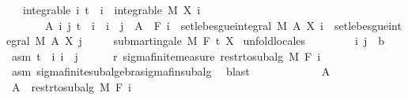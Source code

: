 \begin{isabellebody}
\ \ \ integrable{\isacharcolon}{\kern0pt}\ {\isachardoublequoteopen}{\isasymAnd}i{\isachardot}{\kern0pt}\ t\ {\isasymle}\ i\ {\isasymLongrightarrow}\ integrable\ M\ {\isacharparenleft}{\kern0pt}X\ i{\isacharparenright}{\kern0pt}{\isachardoublequoteclose}\isanewline
\ \ \ \ \ \ \ {\isachardoublequoteopen}{\isasymAnd}A\ i\ j{\isachardot}{\kern0pt}\ t\ {\isasymle}\ i\ {\isasymLongrightarrow}\ i\ {\isasymle}\ j\ {\isasymLongrightarrow}\ A\ {\isasymin}\ F\ i\ {\isasymLongrightarrow}\ set{\isacharunderscore}{\kern0pt}lebesgue{\isacharunderscore}{\kern0pt}integral\ M\ A\ {\isacharparenleft}{\kern0pt}X\ i{\isacharparenright}{\kern0pt}\ {\isasymle}\ set{\isacharunderscore}{\kern0pt}lebesgue{\isacharunderscore}{\kern0pt}integral\ M\ A\ {\isacharparenleft}{\kern0pt}X\ j{\isacharparenright}{\kern0pt}{\isachardoublequoteclose}\isanewline
\ \ \ \ \ {\isachardoublequoteopen}submartingale\ M\ F\ t\ X{\isachardoublequoteclose}\isanewline
%
\isadelimproof
%
\endisadelimproof
%
\isatagproof
{}\isamarkupfalse%
\ {\isacharparenleft}{\kern0pt}unfold{\isacharunderscore}{\kern0pt}locales{\isacharparenright}{\kern0pt}\isanewline
\ \ \isacommand{{\isacharbraceleft}{\kern0pt}}\isamarkupfalse%
\isanewline
\ \ \ \ \isamarkupfalse%
\ i\ j\ {\isacharcolon}{\kern0pt}{\isacharcolon}{\kern0pt}\ {\isacharprime}{\kern0pt}b\ \isamarkupfalse%
\ asm{\isacharcolon}{\kern0pt}\ {\isachardoublequoteopen}t\ {\isasymle}\ i{\isachardoublequoteclose}\ {\isachardoublequoteopen}i\ {\isasymle}\ j{\isachardoublequoteclose}\isanewline
\ \ \ \ \isamarkupfalse%
\ r{\isacharcolon}{\kern0pt}\ sigma{\isacharunderscore}{\kern0pt}finite{\isacharunderscore}{\kern0pt}measure\ {\isachardoublequoteopen}restr{\isacharunderscore}{\kern0pt}to{\isacharunderscore}{\kern0pt}subalg\ M\ {\isacharparenleft}{\kern0pt}F\ i{\isacharparenright}{\kern0pt}{\isachardoublequoteclose}\ \isamarkupfalse%
\ asm\ sigma{\isacharunderscore}{\kern0pt}finite{\isacharunderscore}{\kern0pt}subalgebra{\isachardot}{\kern0pt}sigma{\isacharunderscore}{\kern0pt}fin{\isacharunderscore}{\kern0pt}subalg\ \isamarkupfalse%
\ blast\isanewline
\ \ \ \ \isacommand{{\isacharbraceleft}{\kern0pt}}\isamarkupfalse%
\isanewline
\ \ \ \ \ \ \isamarkupfalse%
\ A\ \isamarkupfalse%
\ {\isachardoublequoteopen}A\ {\isasymin}\ restr{\isacharunderscore}{\kern0pt}to{\isacharunderscore}{\kern0pt}subalg\ M\ {\isacharparenleft}{\kern0pt}F\ i{\isacharparenright}{\kern0pt}{\isachardoublequoteclose}\isanewline

\end{isabellebody}
